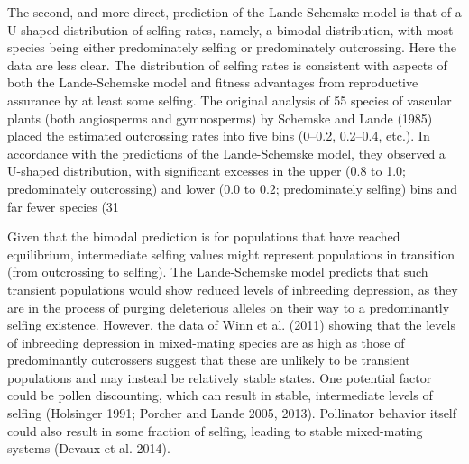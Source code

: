 \documentclass{article}
\begin{document}
The second, and more direct, prediction of the Lande-Schemske model is that of a U-shaped distribution of selfing rates, namely, a bimodal distribution, with most species being either predominately selfing or predominately outcrossing. Here the data are less clear. The distribution of selfing rates is consistent with aspects of both the Lande-Schemske model and fitness advantages from reproductive assurance by at least some selfing. The original analysis of 55 species of vascular plants (both angiosperms and gymnosperms) by Schemske and Lande (1985) placed the estimated outcrossing rates into five bins (0–0.2, 0.2–0.4, etc.). In accordance with the predictions of the Lande-Schemske model, they observed a U-shaped distribution, with significant excesses in the upper (0.8 to 1.0; predominately outcrossing) and lower (0.0 to 0.2; predominately selfing) bins and far fewer species (31%

Given that the bimodal prediction is for populations that have reached equilibrium, intermediate selfing values might represent populations in transition (from outcrossing to selfing). The Lande-Schemske model predicts that such transient populations would show reduced levels of inbreeding depression, as they are in the process of purging deleterious alleles on their way to a predominantly selfing existence. However, the data of Winn et al. (2011) showing that the levels of inbreeding depression in mixed-mating species are as high as those of predominantly outcrossers suggest that these are unlikely to be transient populations and may instead be relatively stable states. One potential factor could be pollen discounting, which can result in stable, intermediate levels of selfing (Holsinger 1991; Porcher and Lande 2005, 2013). Pollinator behavior itself could also result in some fraction of selfing, leading to stable mixed-mating systems (Devaux et al. 2014).
\end{document}
